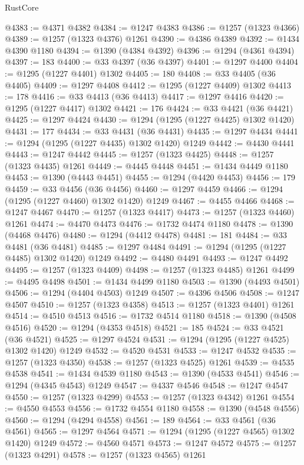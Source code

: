 \begin{lexlean}{RustCore}
\begin{coremodule}
@4383 := @4371 @4382
@4384 := @1247 @4383
@4386 := @1257 (@1323 @4366)
@4389 := @1257 (@1323 @4376) @1261
@4390 := @4386 @4389
@4392 := @1434 @4390 @1180
@4394 := @1390 (@4384 @4392)
@4396 := @1294 (@4361 @4394)
@4397 := 183
@4400 := @33 @4397 (@36 @4397)
@4401 := @1297 @4400
@4404 := @1295 (@1227 @4401) @1302
@4405 := 180
@4408 := @33 @4405 (@36 @4405)
@4409 := @1297 @4408
@4412 := @1295 (@1227 @4409) @1302
@4413 := 178
@4416 := @33 @4413 (@36 @4413)
@4417 := @1297 @4416
@4420 := @1295 (@1227 @4417) @1302
@4421 := 176
@4424 := @33 @4421 (@36 @4421)
@4425 := @1297 @4424
@4430 := @1294 (@1295 (@1227 @4425) @1302 @1420)
@4431 := 177
@4434 := @33 @4431 (@36 @4431)
@4435 := @1297 @4434
@4441 := @1294 (@1295 (@1227 @4435) @1302 @1420) @1249
@4442 := @4430 @4441
@4443 := @1247 @4442
@4445 := @1257 (@1323 @4425)
@4448 := @1257 (@1323 @4435) @1261
@4449 := @4445 @4448
@4451 := @1434 @4449 @1180
@4453 := @1390 (@4443 @4451)
@4455 := @1294 (@4420 @4453)
@4456 := 179
@4459 := @33 @4456 (@36 @4456)
@4460 := @1297 @4459
@4466 := @1294 (@1295 (@1227 @4460) @1302 @1420) @1249
@4467 := @4455 @4466
@4468 := @1247 @4467
@4470 := @1257 (@1323 @4417)
@4473 := @1257 (@1323 @4460) @1261
@4474 := @4470 @4473
@4476 := @1732 @4474 @1180
@4478 := @1390 (@4468 @4476)
@4480 := @1294 (@4412 @4478)
@4481 := 181
@4484 := @33 @4481 (@36 @4481)
@4485 := @1297 @4484
@4491 := @1294 (@1295 (@1227 @4485) @1302 @1420) @1249
@4492 := @4480 @4491
@4493 := @1247 @4492
@4495 := @1257 (@1323 @4409)
@4498 := @1257 (@1323 @4485) @1261
@4499 := @4495 @4498
@4501 := @1434 @4499 @1180
@4503 := @1390 (@4493 @4501)
@4506 := @1294 (@4404 @4503) @1249
@4507 := @4396 @4506
@4508 := @1247 @4507
@4510 := @1257 (@1323 @4358)
@4513 := @1257 (@1323 @4401) @1261
@4514 := @4510 @4513
@4516 := @1732 @4514 @1180
@4518 := @1390 (@4508 @4516)
@4520 := @1294 (@4353 @4518)
@4521 := 185
@4524 := @33 @4521 (@36 @4521)
@4525 := @1297 @4524
@4531 := @1294 (@1295 (@1227 @4525) @1302 @1420) @1249
@4532 := @4520 @4531
@4533 := @1247 @4532
@4535 := @1257 (@1323 @4350)
@4538 := @1257 (@1323 @4525) @1261
@4539 := @4535 @4538
@4541 := @1434 @4539 @1180
@4543 := @1390 (@4533 @4541)
@4546 := @1294 (@4345 @4543) @1249
@4547 := @4337 @4546
@4548 := @1247 @4547
@4550 := @1257 (@1323 @4299)
@4553 := @1257 (@1323 @4342) @1261
@4554 := @4550 @4553
@4556 := @1732 @4554 @1180
@4558 := @1390 (@4548 @4556)
@4560 := @1294 (@4294 @4558)
@4561 := 189
@4564 := @33 @4561 (@36 @4561)
@4565 := @1297 @4564
@4571 := @1294 (@1295 (@1227 @4565) @1302 @1420) @1249
@4572 := @4560 @4571
@4573 := @1247 @4572
@4575 := @1257 (@1323 @4291)
@4578 := @1257 (@1323 @4565) @1261

\end{coremodule}
\end{lexlean}

